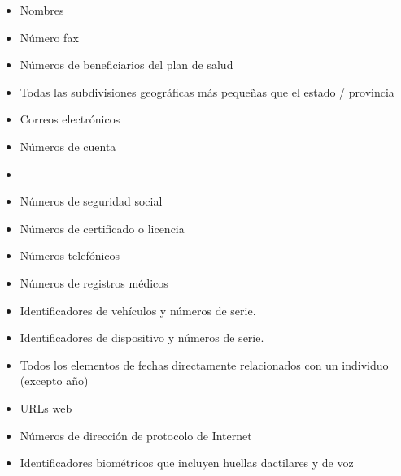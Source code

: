\documentclass[11pt,en]{elegantpaper}
\begin{document}
\begin{multicols}{3}

\begin{itemize}
	\item Nombres
	
	\item Número fax
	
	\item Números de beneficiarios del plan de salud
	
	\item Todas las subdivisiones geográficas más pequeñas que el estado / provincia
	
	\item Correos electrónicos
	
	\item Números de cuenta
	
	\item[\vspace{\fill}]
	
	\item Números de seguridad social
	
	\item Números de certificado o licencia
	
	\item Números telefónicos
	
	\item Números de registros médicos
	
	\item Identificadores de vehículos y números de serie.
	
	\item Identificadores de dispositivo y números de serie.

	\item Todos los elementos de fechas directamente relacionados con un individuo (excepto año)
		
	\item URLs web
	
	\item Números de dirección de protocolo de Internet
	
	\item Identificadores biométricos que incluyen huellas dactilares y de voz
	
\end{itemize}

\end{multicols}

\newpage 
\appendix 
\end{document}
